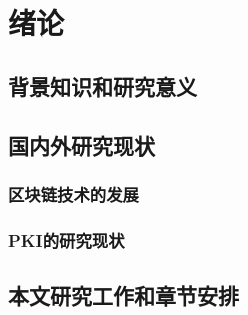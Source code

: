 
\chapter{绪论}

\section{背景知识和研究意义}

\section{国内外研究现状}

\subsection{区块链技术的发展}

\subsection{PKI的研究现状}

\section{本文研究工作和章节安排}

